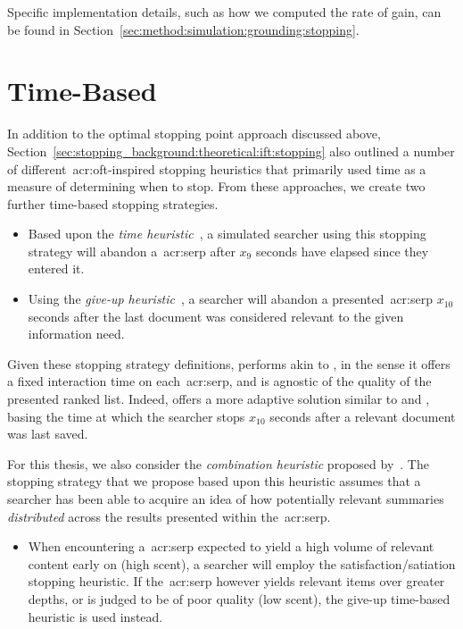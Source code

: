 Specific implementation details, such as how we computed the rate of gain, can be found in Section~\ref{sec:method:simulation:grounding:stopping}.

\section{Time-Based}\label{sec:strategies:time}
In addition to the optimal stopping point approach discussed above, Section~\ref{sec:stopping_background:theoretical:ift:stopping} also outlined a number of different~\gls{acr:oft}-inspired stopping heuristics that primarily used time as a measure of determining when to stop. From these approaches, we create two further time-based stopping strategies.

\begin{itemize}
    \item{ Based upon the \emph{time heuristic}~\citep{charles1972behaviour, krebs1973time_rule}, a simulated searcher using this stopping strategy will abandon a~\gls{acr:serp} after $x_9$ seconds have elapsed since they entered it.}
    
    \item{ Using the \emph{give-up heuristic}~\citep{krebs1974leave_after_rule}, a searcher will abandon a presented~\gls{acr:serp} $x_{10}$ seconds after the last document was considered relevant to the given information need.}
\end{itemize}

Given these stopping strategy definitions,  performs akin to , in the sense it offers a fixed interaction time on each~\gls{acr:serp}, and is agnostic of the quality of the presented ranked list. Indeed,  offers a more adaptive solution similar to  and , basing the time at which the searcher stops $x_{10}$ seconds after a relevant document was last saved.

For this thesis, we also consider the \emph{combination heuristic} proposed by~\cite{mcnair1982gut_mvt}. The stopping strategy that we propose based upon this heuristic assumes that a searcher has been able to acquire an idea of how potentially relevant summaries \emph{distributed} across the results presented within the~\gls{acr:serp}.

\begin{itemize}
    \item{ When encountering a~\gls{acr:serp} expected to yield a high volume of relevant content early on (high scent), a searcher will employ the satisfaction/satiation stopping heuristic. If the~\gls{acr:serp} however yields relevant items over greater depths, or is judged to be of poor quality (low scent), the give-up time-based heuristic is used instead.}
\end{itemize}

